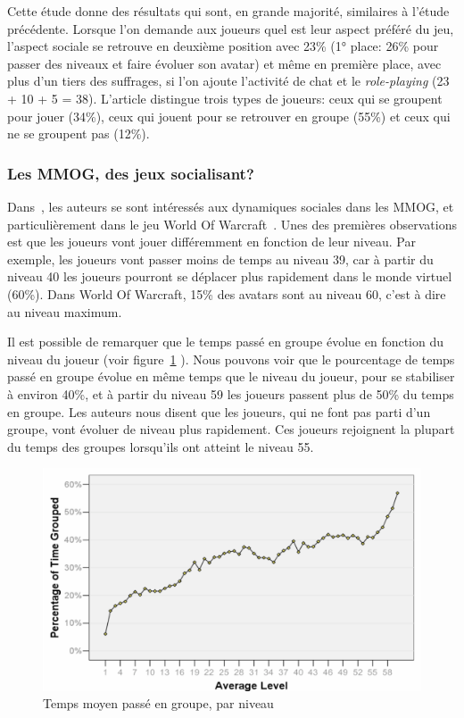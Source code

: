 Cette étude donne des résultats qui sont, en grande majorité, similaires à l'étude précédente. Lorsque l'on demande aux joueurs quel est leur aspect préféré du jeu, l'aspect sociale se retrouve en deuxième position avec 23\% (1° place: 26\% pour passer des niveaux et faire évoluer son avatar) et même en première place, avec plus d'un tiers des suffrages, si l'on ajoute l'activité de chat et le \textit{role-playing} (23 + 10 + 5 = 38). L'article distingue trois types de joueurs: ceux qui se groupent pour jouer (34\%), ceux qui jouent pour se retrouver en groupe (55\%) et ceux qui ne se groupent pas (12\%).



\subsubsection{Les MMOG, des jeux socialisant?}
\par Dans~\cite{1124834}, les auteurs se sont intéressés aux dynamiques sociales dans les MMOG, et particulièrement dans le jeu World Of Warcraft~\cite{wow}. Unes des premières observations est que les joueurs vont jouer différemment en fonction de leur niveau. Par exemple, les joueurs vont passer moins de temps au niveau 39, car à partir du niveau 40 les joueurs pourront se déplacer plus rapidement dans le monde virtuel (60\%). Dans World Of Warcraft, 15\% des avatars sont au niveau 60, c'est à dire au niveau maximum.

\par Il est possible de remarquer que le temps passé en groupe évolue en fonction du niveau du joueur (voir figure~\ref{timespentgroup} ). Nous pouvons voir que le pourcentage de temps passé en groupe évolue en même temps que le niveau du joueur, pour se stabiliser à environ 40\%, et à partir du niveau 59 les joueurs passent plus de 50\% du temps en groupe. Les auteurs nous disent que les joueurs, qui ne font pas parti d'un groupe, vont évoluer de niveau plus rapidement. Ces joueurs rejoignent la plupart du temps des groupes lorsqu'ils ont atteint le niveau 55. 
	\begin{figure}[!h]
        \centering
        \includegraphics[scale=0.95]{./Ressources/Images/timespentgroup.png}
        \caption{Temps moyen passé en groupe, par niveau}
        \label{timespentgroup}
        \end{figure}

